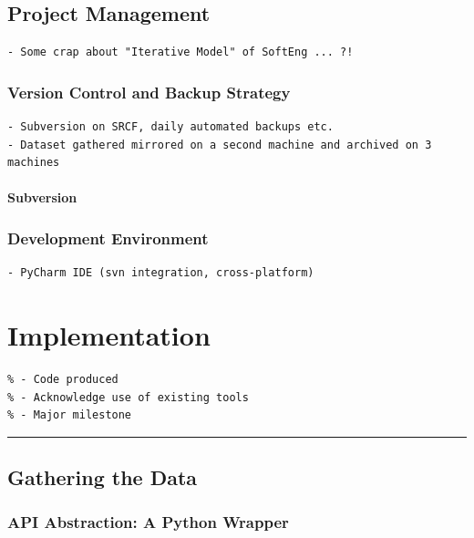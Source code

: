 \documentclass[a4paper,12pt,twoside,notitlepage]{report}
\newcommand{\rulewidth}{300pt}
\newcommand{\halfrule}{
  \begin{center}
    {\rule{\rulewidth}{0.5pt}}
  \end{center}}
\begin{document}
\section{Project Management}

\begin{verbatim}
- Some crap about "Iterative Model" of SoftEng ... ?! 
\end{verbatim}

\subsection{Version Control and Backup Strategy}
\begin{verbatim}
- Subversion on SRCF, daily automated backups etc.
- Dataset gathered mirrored on a second machine and archived on 3 machines
\end{verbatim}

\subsubsection{Subversion} 

\subsection{Development Environment}
\begin{verbatim}
- PyCharm IDE (svn integration, cross-platform)
\end{verbatim}


\chapter{Implementation}

\begin{verbatim}
% - Code produced
% - Acknowledge use of existing tools
% - Major milestone 
\end{verbatim}

\halfrule

\section{Gathering the Data}

\subsection{API Abstraction: A Python Wrapper}
\end{document}
